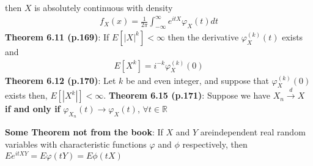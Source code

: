 \documentclass[]{article}
\begin{document}
then $X$ is absolutely continuous with density
$$
\begin{aligned}
	f_X(x) = \frac{1}{2\pi} \int_{-\infty}^{\infty}e^{itX} \varphi_X(t) dt
\end{aligned}
$$
\textbf{Theorem 6.11 (p.169)}: If $E[|X|^k] < \infty$ then the derivative $\varphi^{(k)}_X(t)$ exists  and
$$
\begin{aligned}
	E[X^k] = i^{-k}\varphi^{(k)}_X(0)
\end{aligned}
$$
\textbf{Theorem 6.12 (p.170)}: Let $k$ be and even integer, and suppose that $\varphi_X^{(k)}(0)$ exists then, $E[|X^k|] < \infty$.
\textbf{Theorem 6.15 (p.171)}: Suppose we have $X_n \overset{d}{\rightarrow} X$ \textbf{if and only if} $\varphi_{X_n}(t) \rightarrow \varphi_{X}(t)$, $\forall t \in \mathbb{R}$

\textbf{Some Theorem not from the book}: If $X$ and $Y$ areindependent real random variables with characteristic functions $\varphi$ and $\phi$ respectively, then $E e^{itXY}=E\varphi(tY)=E\phi(tX)$
\clearpage

\end{document}
